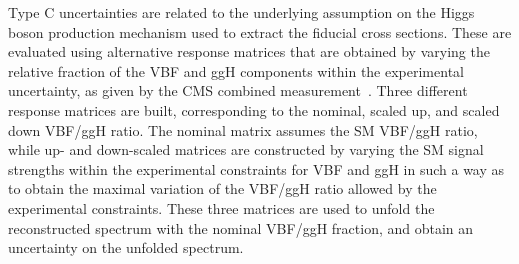 Type C uncertainties are related to the underlying assumption on the Higgs boson production mechanism used to extract the fiducial cross sections. These are evaluated using alternative response matrices that are obtained by varying the relative fraction of the VBF and ggH components within the experimental uncertainty, as given by the CMS combined measurement~\cite{Khachatryan:2014jba}.
Three different response matrices are built, corresponding to the nominal, scaled up, and scaled down
VBF/ggH ratio. The nominal matrix assumes the SM VBF/ggH ratio, %
while up- and down-scaled matrices are constructed by varying the SM signal strengths within the
experimental constraints for VBF and ggH in such a way as to obtain the
maximal variation of the VBF/ggH ratio allowed by the experimental
constraints.
These three matrices are used to unfold the reconstructed spectrum with the nominal VBF/ggH fraction, and obtain an uncertainty on the unfolded spectrum.


